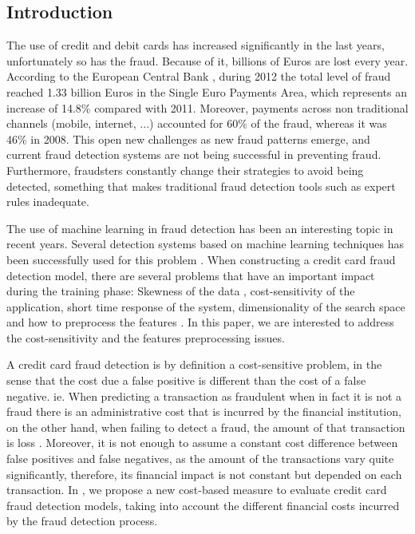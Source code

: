 \subsection{Introduction}

  The use of credit and debit cards has increased significantly   in the last years, unfortunately 
	so has the fraud. Because of it, billions of Euros are lost every year. According to 
	the European Central Bank \citep{EuropeanCentralBank2013}, during 2012 the total level of fraud 
	reached 1.33 billion Euros in the Single Euro Payments Area, which represents an increase of 
	14.8\% compared with 2011. Moreover, payments across non traditional channels (mobile, internet, 
	...) accounted for 60\% of the fraud, whereas it was 46\% in 2008. This open new challenges as 
	new fraud patterns emerge, and current fraud detection systems are not being successful in 
	preventing fraud. Furthermore, fraudsters constantly change their strategies to avoid being 
	detected, something that makes traditional fraud detection tools such as expert rules inadequate.
  
  The use of machine learning in fraud detection has been an interesting topic in recent years. 
  Several detection systems based on machine learning techniques has been successfully used 
	for this problem \citep{Bhattacharyya2011}. When constructing a credit card fraud detection 
model, 
	there are several problems that have an important impact during the training phase: Skewness of 	
	the data , cost-sensitivity of the application, short time response of the system, dimensionality 
	of the search space and how to preprocess the features
	\citep{Bolton2002,Gadi2008,Whitrow2008,DalPozzolo2014}.	In this paper, we are interested to 
	address the cost-sensitivity and the features preprocessing 	issues. 
	
	A credit card fraud detection is by definition a cost-sensitive problem, in the sense that the 
	cost 	due a false positive is different than the cost of a false negative. ie. When predicting a 	
	transaction 	as fraudulent when in fact it is not a fraud there is an administrative cost that 	
	is incurred by 	the financial institution, on the other hand, when failing to detect a fraud, the 
	amount of that 	transaction is loss \citep{Hand2007a}. Moreover, it is not enough  to assume a 	
	constant cost 	difference between false positives and false negatives, as the amount of the 	
	transactions vary 	quite significantly, therefore, its financial impact is not constant but 	
	depended on each 	transaction.	In \citep{CorreaBahnsen2013}, we propose a new cost-based measure 
	to evaluate 	credit card fraud detection models, taking into account the different financial 	
	costs incurred by 	the fraud detection process.
	
